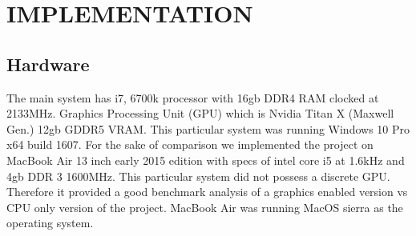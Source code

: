 \chapter{IMPLEMENTATION}

\section{Hardware}

\hspace{0.9cm} The main system has i7, 6700k processor with 16gb DDR4 RAM clocked at 2133MHz.
Graphics Processing Unit (GPU) which is Nvidia Titan X (Maxwell Gen.) 12gb GDDR5 VRAM. This particular system was running Windows 10 Pro x64 build 1607.
For the sake of comparison we implemented the project on MacBook Air 13 inch early 2015 edition with specs of intel core i5 at 1.6kHz and 4gb DDR 3 1600MHz.
This particular system did not possess a discrete GPU.
Therefore it provided a good benchmark analysis of a graphics enabled version vs CPU only version of the project.
MacBook Air was running MacOS sierra as the operating system.
